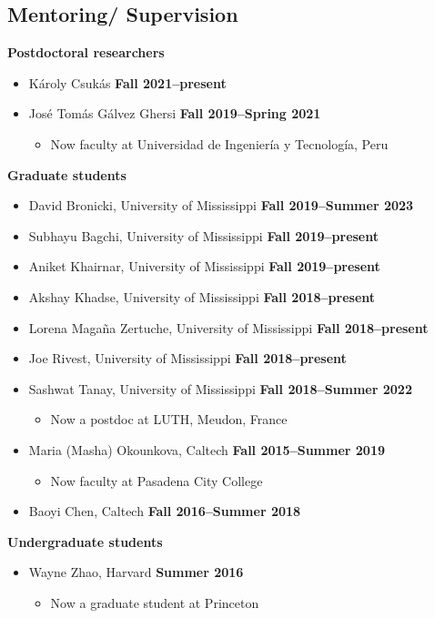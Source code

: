 \documentclass[margin,line]{res}
\begin{document}
\begin{resume}
\section{\sc Mentoring/
  Supervision}
{\bf Postdoctoral researchers}
\begin{itemize}
\item[] Károly Csukás
\hfill {\bf Fall 2021--present}
\item[] José Tomás Gálvez Ghersi
\hfill {\bf Fall 2019--Spring 2021}
\begin{itemize}
\item[] Now faculty at Universidad de Ingeniería y Tecnología, Peru
\end{itemize}
\end{itemize}
{\bf Graduate students}
\begin{itemize}
\item[] David Bronicki, University of Mississippi
\hfill {\bf Fall 2019--Summer 2023}
\item[] Subhayu Bagchi, University of Mississippi
\hfill {\bf Fall 2019--present}
\item[] Aniket Khairnar, University of Mississippi
\hfill {\bf Fall 2019--present}
\item[] Akshay Khadse, University of Mississippi
\hfill {\bf Fall 2018--present}
\item[] Lorena Magaña Zertuche, University of Mississippi
\hfill {\bf Fall 2018--present}
\item[] Joe Rivest, University of Mississippi
\hfill {\bf Fall 2018--present}
\item[] Sashwat Tanay, University of Mississippi
\hfill {\bf Fall 2018--Summer 2022}
\begin{itemize}
\item[] Now a postdoc at LUTH, Meudon, France
\end{itemize}
\item[] Maria (Masha) Okounkova, Caltech
\hfill {\bf Fall 2015--Summer 2019}
\begin{itemize}
\item[] Now faculty at Pasadena City College
\end{itemize}
\item[] Baoyi Chen, Caltech
\hfill {\bf Fall 2016--Summer 2018}
\end{itemize}
{\bf Undergraduate students}
\begin{itemize}
\item[] Wayne Zhao, Harvard
\hfill {\bf Summer 2016}
\begin{itemize}
\item[] Now a graduate student at Princeton
\end{itemize}
\end{itemize}


\end{resume}
\end{document}
